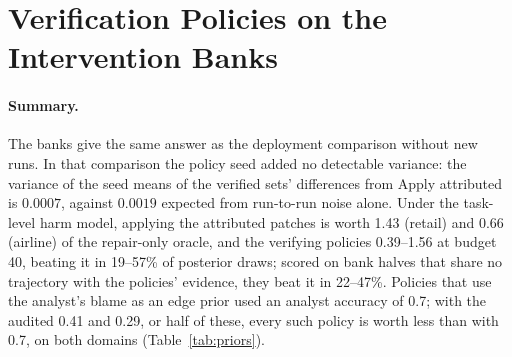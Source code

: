 \documentclass[11pt]{article}
\begin{document}
\section{Verification Policies on the Intervention Banks}
\label{app:policies}

\paragraph{Summary.} The banks give the same answer as the deployment comparison without new runs. In that comparison the policy seed added no detectable variance: the variance of the seed means of the verified sets' differences from Apply attributed is $0.0007$, against $0.0019$ expected from run-to-run noise alone. Under the task-level harm model, applying the attributed patches is worth 1.43 (retail) and 0.66 (airline) of the repair-only oracle, and the verifying policies 0.39--1.56 at budget 40, beating it in 19--57\% of posterior draws; scored on bank halves that share no trajectory with the policies' evidence, they beat it in 22--47\%. Policies that use the analyst's blame as an edge prior used an analyst accuracy of 0.7; with the audited 0.41 and 0.29, or half of these, every such policy is worth less than with 0.7, on both domains (Table~\ref{tab:priors}).
\end{document}
